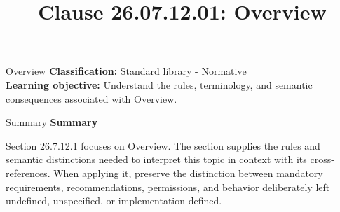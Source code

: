 \documentclass[10pt,letterpaper]{article}
\title{Clause 26.07.12.01: Overview}
\author{}
\date{}
\begin{document}
\maketitle
\begin{CornellOverviewBox}{Overview}
\textbf{Classification:} Standard library - Normative\\[2pt]
\textbf{Learning objective:} Understand the rules, terminology, and semantic consequences associated with Overview.
\end{CornellOverviewBox}\begin{CornellSummaryBox}{Summary}
{\sffamily\bfseries\color{Accent} Summary}\par\vspace{3pt}Section 26.7.12.1 focuses on Overview. The section supplies the rules and semantic distinctions needed to interpret this topic in context with its cross-references. When applying it, preserve the distinction between mandatory requirements, recommendations, permissions, and behavior deliberately left undefined, unspecified, or implementation-defined.
\end{CornellSummaryBox}
\end{document}
